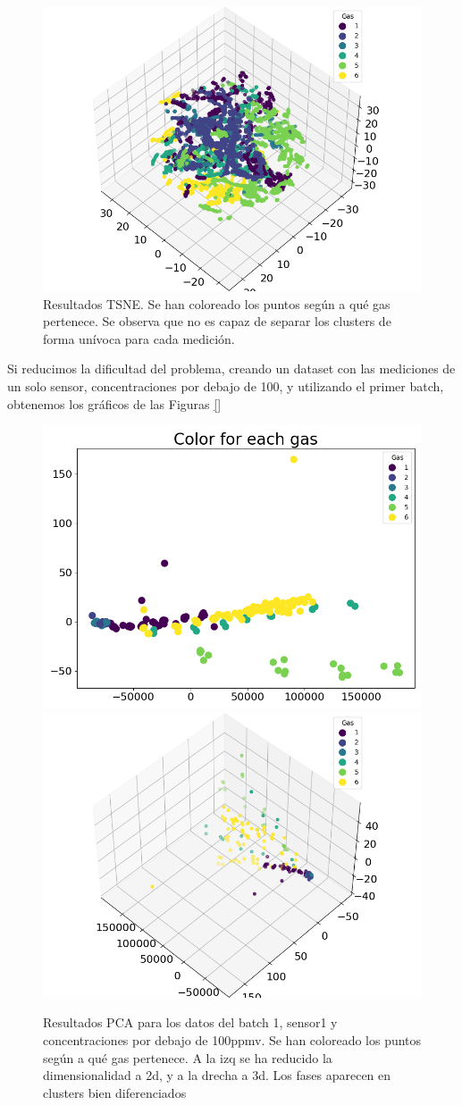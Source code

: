 \begin{figure}[h!]
	\centering
	\includegraphics[width=0.9\linewidth]{"../py_imgs/Step0_3_TSNE_3d_All data"}
	\caption[Resultados TSNE]{Resultados TSNE. Se han coloreado los  puntos según a qué gas pertenece. Se observa que no es capaz de separar los clusters de forma unívoca para cada medición.}
	\label{fig:step03tsnecolor-for-each-gas}
\end{figure}

Si reducimos la dificultad del problema, creando un dataset con las mediciones de un solo sensor, concentraciones por debajo de 100, y utilizando el primer batch, obtenemos los gráficos de las Figuras \ref{}

\begin{figure}[h!]
	\centering
	\includegraphics[width=0.45\linewidth]{"../py_imgs/Step0_3_Color for each gas_Batch1_Sensor1_Conc less 100ppmv"}
	\includegraphics[width=0.45\linewidth]{"../py_imgs/Step0_3_Color for each gas_3d_Batch1_Sensor1_Conc less 100ppmv"}
	\caption[Resultados PCA modelo simplificado]{Resultados PCA para los datos del batch 1, sensor1 y concentraciones por debajo de 100ppmv. Se han coloreado los  puntos según a qué gas pertenece. A la izq se ha reducido la dimensionalidad a 2d, y a la drecha a 3d. Los fases aparecen en clusters bien diferenciados}
	\label{fig:step03kmeans-reduced-color-for-each-gas}
\end{figure}

